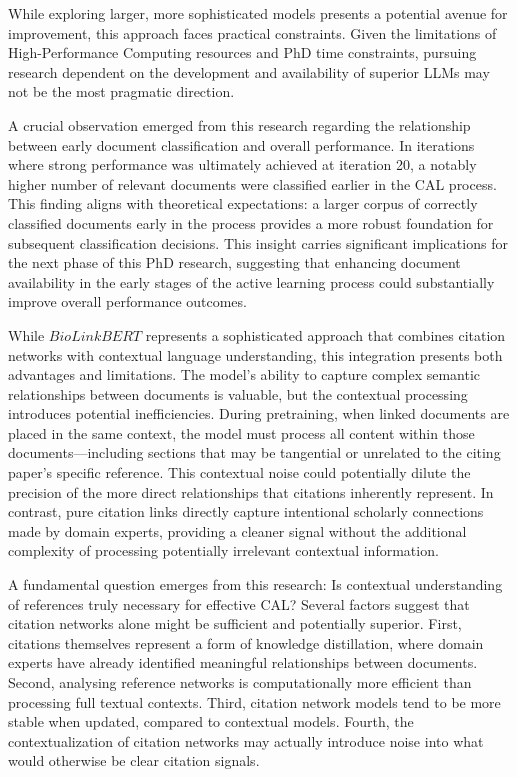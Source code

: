 \documentclass[../main.tex]{subfiles}
\begin{document}
While exploring larger, more sophisticated models presents a potential avenue for improvement, this approach faces practical constraints. Given the limitations of High-Performance Computing resources and PhD time constraints, pursuing research dependent on the development and availability of superior LLMs may not be the most pragmatic direction.

A crucial observation emerged from this research regarding the relationship between early document classification and overall performance. In iterations where strong performance was ultimately achieved at iteration 20, a notably higher number of relevant documents were classified earlier in the CAL process. This finding aligns with theoretical expectations: a larger corpus of correctly classified documents early in the process provides a more robust foundation for subsequent classification decisions. This insight carries significant implications for the next phase of this PhD research, suggesting that enhancing document availability in the early stages of the active learning process could substantially improve overall performance outcomes.

While $BioLinkBERT$ represents a sophisticated approach that combines citation networks with contextual language understanding, this integration presents both advantages and limitations. The model's ability to capture complex semantic relationships between documents is valuable, but the contextual processing introduces potential inefficiencies. During pretraining, when linked documents are placed in the same context, the model must process all content within those documents—including sections that may be tangential or unrelated to the citing paper's specific reference. This contextual noise could potentially dilute the precision of the more direct relationships that citations inherently represent. In contrast, pure citation links directly capture intentional scholarly connections made by domain experts, providing a cleaner signal without the additional complexity of processing potentially irrelevant contextual information.

A fundamental question emerges from this research: Is contextual understanding of references truly necessary for effective CAL? Several factors suggest that citation networks alone might be sufficient and potentially superior. First, citations themselves represent a form of knowledge distillation, where domain experts have already identified meaningful relationships between documents. Second, analysing reference networks is computationally more efficient than processing full textual contexts. Third, citation network models tend to be more stable when updated, compared to contextual models. Fourth, the contextualization of citation networks may actually introduce noise into what would otherwise be clear citation signals.
\end{document}
